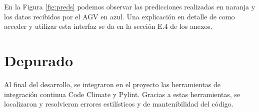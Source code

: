 
En la Figura \ref{fig:preds} podemos observar las predicciones realizadas en naranja y los datos 
recibidos por el AGV en azul. Una explicación en detalle de como acceder y utilizar esta interfaz se da 
en la sección E.4 de los anexos.

\section{Depurado}

Al final del desarrollo, se integraron en el proyecto las herramientas de integración continua Code Climate y 
Pylint. Gracias a estas herramientas, se localizaron y resolvieron errores estilísticos y de mantenibilidad del código.